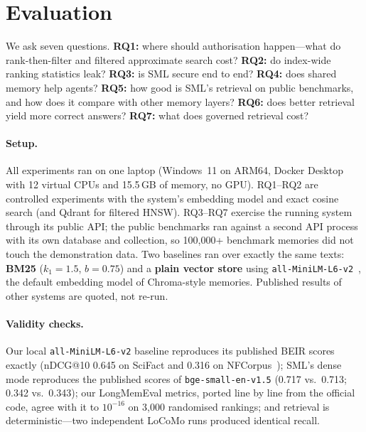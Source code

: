 \documentclass[11pt,a4paper]{article}
\theoremstyle{remark}
\newcommand{\sys}{SML}
\begin{document}
\section{Evaluation}
\label{sec:eval}

We ask seven questions. \textbf{RQ1:} where should authorisation happen---what do rank-then-filter and filtered
approximate search cost? \textbf{RQ2:} do index-wide ranking statistics leak? \textbf{RQ3:} is \sys{} secure end to end?
\textbf{RQ4:} does shared memory help agents? \textbf{RQ5:} how good is \sys{}'s retrieval on public benchmarks, and how
does it compare with other memory layers? \textbf{RQ6:} does better retrieval yield more correct answers?
\textbf{RQ7:} what does governed retrieval cost?

\paragraph{Setup.} All experiments ran on one laptop (Windows~11 on ARM64, Docker Desktop with 12 virtual CPUs and
15.5\,GB of memory, no GPU). RQ1--RQ2 are controlled experiments with the system's embedding model and exact cosine
search (and Qdrant for filtered HNSW). RQ3--RQ7 exercise the running system through its public API; the public
benchmarks ran against a second API process with its own database and collection, so 100{,}000+ benchmark memories did
not touch the demonstration data. Two baselines ran over exactly the same texts: \textbf{BM25} ($k_1{=}1.5$, $b{=}0.75$)
and a \textbf{plain vector store} using \texttt{all-MiniLM-L6-v2}~\cite{wang2020minilm,reimers2019sbert}, the default
embedding model of Chroma-style memories. Published results of other systems are quoted, not re-run.

\paragraph{Validity checks.} Our local \texttt{all-MiniLM-L6-v2} baseline reproduces its published BEIR scores exactly
(nDCG@10 0.645 on SciFact and 0.316 on NFCorpus~\cite{muennighoff2023mteb}); \sys{}'s dense mode reproduces the published
scores of \texttt{bge-small-en-v1.5} (0.717 vs.\ 0.713; 0.342 vs.\ 0.343); our LongMemEval metrics, ported line by line
from the official code, agree with it to $10^{-16}$ on 3{,}000 randomised rankings; and retrieval is deterministic---two
independent LoCoMo runs produced identical recall.
\end{document}
